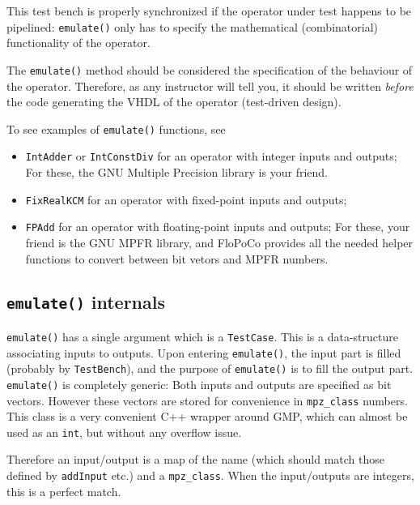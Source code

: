 \documentclass{article}
\begin{document}
This test bench is properly synchronized if the operator under test happens to be pipelined: \texttt{\small emulate()} only has to specify the mathematical (combinatorial) functionality of the operator.

The \texttt{\small emulate()} method should be considered  the specification of the behaviour of the operator.
Therefore, as any instructor will tell you, it should be written \emph{before} the code generating the VHDL of the operator (test-driven design).


To see examples of \texttt{emulate()} functions, see
\begin{itemize}
\item \texttt{IntAdder} or \texttt{IntConstDiv} for an operator with integer inputs and outputs;
  For these, the GNU Multiple Precision library is your friend.
\item \texttt{FixRealKCM} for an operator with fixed-point inputs and outputs;
\item \texttt{FPAdd}  for an operator with floating-point inputs and outputs;
  For these, your friend is the GNU MPFR library, and FloPoCo provides all the needed helper functions to convert between bit vetors and MPFR numbers.
\end{itemize}


\subsection{\texttt{emulate()}  internals}
\texttt{\small emulate()} has a single argument which is a \texttt{\small TestCase}.
This is a data-structure associating inputs to outputs.
Upon entering \texttt{\small emulate()}, the input part is filled (probably by \texttt{\small TestBench}), and the purpose of \texttt{\small emulate()} is to fill the output part.
\texttt{\small emulate()} is completely generic:
Both inputs and outputs are specified as bit vectors.
However these vectors are stored for convenience in \texttt{\small mpz\_class} numbers.
This class is a very convenient C++ wrapper around GMP, which can almost be used as an \texttt{\small int}, but without any overflow issue.

Therefore an input/output is a map of the name (which should match those defined by \texttt{\small addInput} etc.) and a \texttt{\small mpz\_class}.
When the input/outputs are integers, this is a perfect match.
\end{document}
